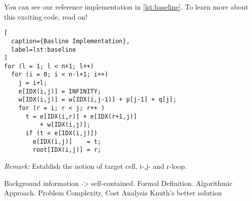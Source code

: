 
You can see our reference implementation in \autoref{lst:baseline}. To
learn more about this exciting code, read on!

\begin{lstlisting}[
  caption={Basline Implementation},
  label=lst:baseline
]
for (l = 1; l < n+1; l++)
  for (i = 0; i < n-l+1; i++)
    j = i+l;
    e[IDX(i,j)] = INFINITY;
    w[IDX(i,j)] = w[IDX(i,j-1)] + p[j-1] + q[j];
    for (r = i; r < j; r++ )
      t = e[IDX(i,r)] + e[IDX(r+1,j)]
          + w[IDX(i,j)];
      if (t < e[IDX(i,j)])
        e[IDX(i,j)]    = t;
        root[IDX(i,j)] = r;
\end{lstlisting}

\emph{Remark:} Establish the notion of target cell, i-,j- and r-loop.

Background information -> self-contained.
Formal Definition.
Algorithmic Approach.
Problem Complexity, Cost Analysis
Knuth's better solution
